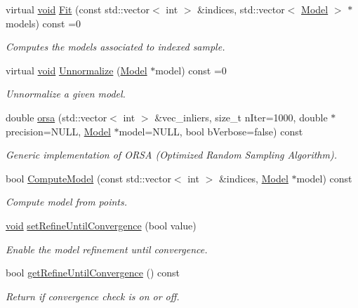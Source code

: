 \begin{DoxyCompactItemize}
virtual \hyperlink{png_8h_aa8c59027f9ab2769342f248709d68d17}{void} \hyperlink{classorsa_1_1OrsaModel_ab08fb727f3802b4b3531e2094069b4df}{Fit} (const std\+::vector$<$ int $>$ \&indices, std\+::vector$<$ \hyperlink{classorsa_1_1OrsaModel_aadc7e7fc0708ca6bc623e75cdc66b5e8}{Model} $>$ $\ast$models) const =0
\begin{DoxyCompactList}\small\item\em Computes the models associated to indexed sample. \end{DoxyCompactList}\item 
virtual \hyperlink{png_8h_aa8c59027f9ab2769342f248709d68d17}{void} \hyperlink{classorsa_1_1OrsaModel_aeadc8d2c929a7740e84ce17396c1cc28}{Unnormalize} (\hyperlink{classorsa_1_1OrsaModel_aadc7e7fc0708ca6bc623e75cdc66b5e8}{Model} $\ast$model) const =0
\begin{DoxyCompactList}\small\item\em Unnormalize a given model. \end{DoxyCompactList}\item 
double \hyperlink{classorsa_1_1OrsaModel_a8494a42c403f1f1731cae066240c473e}{orsa} (std\+::vector$<$ int $>$ \&vec\+\_\+inliers, size\+\_\+t n\+Iter=1000, double $\ast$precision=N\+U\+L\+L, \hyperlink{classorsa_1_1OrsaModel_aadc7e7fc0708ca6bc623e75cdc66b5e8}{Model} $\ast$model=N\+U\+L\+L, bool b\+Verbose=false) const 
\begin{DoxyCompactList}\small\item\em Generic implementation of O\+R\+S\+A (Optimized Random Sampling Algorithm). \end{DoxyCompactList}\item 
bool \hyperlink{classorsa_1_1OrsaModel_a5250601a093bdd964cebf0617c2e0fbc}{Compute\+Model} (const std\+::vector$<$ int $>$ \&indices, \hyperlink{classorsa_1_1OrsaModel_aadc7e7fc0708ca6bc623e75cdc66b5e8}{Model} $\ast$model) const 
\begin{DoxyCompactList}\small\item\em Compute model from points. \end{DoxyCompactList}\item 
\hyperlink{png_8h_aa8c59027f9ab2769342f248709d68d17}{void} \hyperlink{classorsa_1_1OrsaModel_a7ff87f259175fe5aff2ba961dc3f7b5f}{set\+Refine\+Until\+Convergence} (bool value)
\begin{DoxyCompactList}\small\item\em Enable the model refinement until convergence. \end{DoxyCompactList}\item 
bool \hyperlink{classorsa_1_1OrsaModel_a95dd90753a127eac25c2977393ad9149}{get\+Refine\+Until\+Convergence} () const 
\begin{DoxyCompactList}\small\item\em Return if convergence check is on or off. \end{DoxyCompactList}\end{DoxyCompactItemize}
